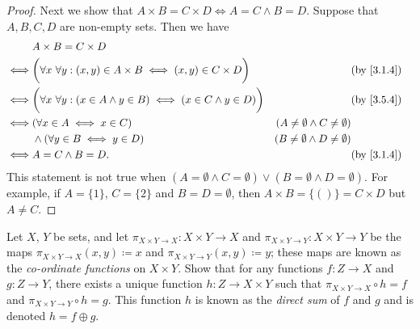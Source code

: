 \begin{proof}
  Next we show that \(A \times B = C \times D \iff A = C \land B = D\).
  Suppose that \(A, B, C, D\) are non-empty sets.
  Then we have
  \begin{align*}
         & A \times B = C \times D                                                                                                                                         \\
    \iff & \bigg(\forall x \ \forall y : (x, y) \in A \times B \iff (x, y) \in C \times D\bigg)     &                                           & \text{(by \cref{3.1.4})} \\
    \iff & \bigg(\forall x \ \forall y : (x \in A \land y \in B) \iff (x \in C \land y \in D)\bigg) &                                           & \text{(by \cref{3.5.4})} \\
    \iff & (\forall x \in A \iff x \in C)                                                           & (A \neq \emptyset \land C \neq \emptyset)                            \\
         & \land (\forall y \in B \iff y \in D)                                                     & (B \neq \emptyset \land D \neq \emptyset)                            \\
    \iff & A = C \land B = D.                                                                       &                                           & \text{(by \cref{3.1.4})}
  \end{align*}
  This statement is not true when \((A = \emptyset \land C = \emptyset) \lor (B = \emptyset \land D = \emptyset)\).
  For example, if \(A = \{1\}\), \(C = \{2\}\) and \(B = D = \emptyset\), then \(A \times B = \{()\} = C \times D\) but \(A \neq C\).
\end{proof}

\begin{ex}\label{ex:3.5.7}
  Let \(X\), \(Y\) be sets, and let \(\pi_{X \times Y \to X} : X \times Y \to X\) and \(\pi_{X \times Y \to Y} : X \times Y \to Y\) be the maps \(\pi_{X \times Y \to X}(x, y) \coloneqq x\) and \(\pi_{X \times Y \to Y}(x, y) \coloneqq y\);
  these maps are known as the \emph{co-ordinate functions} on \(X \times Y\).
  Show that for any functions \(f : Z \to X\) and \(g : Z \to Y\), there exists a unique function \(h : Z \to X \times Y\) such that \(\pi_{X \times Y \to X} \circ h = f\) and \(\pi_{X \times Y \to Y} \circ h = g\).
  This function \(h\) is known as the \emph{direct sum} of \(f\) and \(g\) and is denoted \(h = f \oplus g\).
\end{ex}

